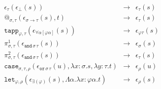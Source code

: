\documentclass[runningheads,a4paper]{llncs}
\newcommand{\quant}[2]{\forall #1[#2]}
\newcommand{\red}{\longrightarrow}
\newcommand{\arrtype}{\rightarrow}
\newcommand{\abs}[2]{\lambda #1.#2}
\newcommand{\tabs}[2]{\Lambda #1.#2}
\begin{document}
\[
\begin{array}{rcl}
\epsilon_\tau(\epsilon_\bot(s)) & \red & \epsilon_\tau(s) \\
@_{\sigma,\tau}(\epsilon_{\sigma \arrtype \tau}(s),t) & \red &
  \epsilon_\tau(s) \\
\mathtt{tapp}_{\varphi,\tau}(
  \epsilon_{\quant{\alpha}{\varphi\alpha}}(s)) & \red &
  \epsilon_{\varphi\tau}(s) \\
\pi^1_{\sigma,\tau}(\epsilon_{\mathtt{and}\,\sigma\,\tau}(s)) & \red &
  \epsilon_\sigma(s) \\
\pi^2_{\sigma,\tau}(\epsilon_{\mathtt{and}\,\sigma\,\tau}(s)) & \red &
  \epsilon_\tau(s) \\
\mathtt{case}_{\sigma,\tau,\rho}(\epsilon_{\mathtt{or}\,\sigma\,\tau}(
  u),\abs{x:\sigma}{s},\abs{y:\tau}{t}) & \red & \epsilon_\rho(u) \\
\mathtt{let}_{\varphi,\rho}(\epsilon_{\exists(\varphi)}(s),\tabs{\alpha}{\abs{x:\varphi\alpha}{t}}) & \red &
  \epsilon_\rho(s) \\
\end{array}
\]
\end{document}
